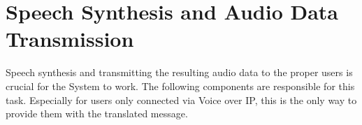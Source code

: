 \chapter{Speech Synthesis and Audio Data Transmission}

\label{SpeechSynthesisAndAudioDataTransmission}

Speech synthesis and transmitting the resulting audio data to the proper users is crucial for the System to work. The 
following components are responsible for this task. Especially for users only connected via Voice over IP, this is the 
only way to provide them with the translated message.

